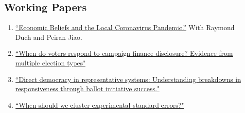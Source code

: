 \documentclass[11pt, a4paper]{article}
\begin{document}
\subsection*{Working Papers}

\begin{enumerate}

\item \href{}{``Economic Beliefs and the Local Coronavirus Pandemic.''} With Raymond Duch and Peiran Jiao.

\item \href{https://ts-robinson.com/publication/robinson-voters-disclosure-2020/robinson-voters-disclosure-2020.pdf}{``When do voters respond to campaign finance disclosure? Evidence from multiple election types"}

\item \href{https://ts-robinson.com/publication/robinson-directdemocracyrepresentative-2020/robinson-directdemocracyrepresentative-2020.pdf}{``Direct democracy in representative systems: Understanding breakdowns in responsiveness through ballot initiative success."} 


\item \href{https://ts-robinson.com/publication/robinson-whenshouldwe-2020/robinson-whenshouldwe-2020.pdf}{``When should we cluster experimental standard errors?" }


\end{enumerate}
\end{document}
